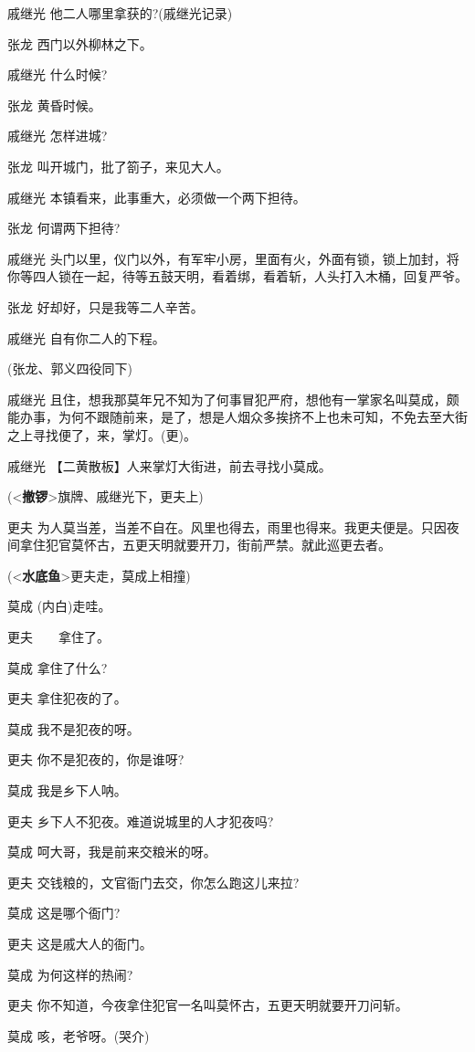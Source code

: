 戚继光 他二人哪里拿获的?(戚继光记录)

张龙 西门以外柳林之下。

戚继光 什么时候?

张龙 黄昏时候。

戚继光 怎样进城?

张龙 叫开城门，批了箚子，来见大人。

戚继光 本镇看来，此事重大，必须做一个两下担待。

张龙 何谓两下担待?

戚继光
头门以里，仪门以外，有军牢小房，里面有火，外面有锁，锁上加封，将你等四人锁在一起，待等五鼓天明，看着绑，看着斩，人头打入木桶，回复严爷。

张龙 好却好，只是我等二人辛苦。

戚继光 自有你二人的下程。

(张龙、郭义四役同下)

戚继光
且住，想我那莫年兄不知为了何事冒犯严府，想他有一掌家名叫莫成，颇能办事，为何不跟随前来，是了，想是人烟众多挨挤不上也未可知，不免去至大街之上寻找便了，来，掌灯。(更)。

戚继光 【二黄散板】人来掌灯大街进，前去寻找小莫成。

(\textless{}\textbf{撤锣}\textgreater{}旗牌、戚继光下，更夫上)

更夫
为人莫当差，当差不自在。风里也得去，雨里也得来。我更夫便是。只因夜间拿住犯官莫怀古，五更天明就要开刀，街前严禁。就此巡更去者。

(\textless{}\textbf{水底鱼}\textgreater{}更夫走，莫成上相撞)

莫成 (内白)走哇。

更夫　　拿住了。

莫成 拿住了什么?

更夫 拿住犯夜的了。

莫成 我不是犯夜的呀。

更夫 你不是犯夜的，你是谁呀?

莫成 我是乡下人呐。

更夫 乡下人不犯夜。难道说城里的人才犯夜吗?

莫成 呵大哥，我是前来交粮米的呀。

更夫 交钱粮的，文官衙门去交，你怎么跑这儿来拉?

莫成 这是哪个衙门?

更夫 这是戚大人的衙门。

莫成 为何这样的热闹?

更夫 你不知道，今夜拿住犯官一名叫莫怀古，五更天明就要开刀问斩。

莫成 咳，老爷呀。(哭介)

